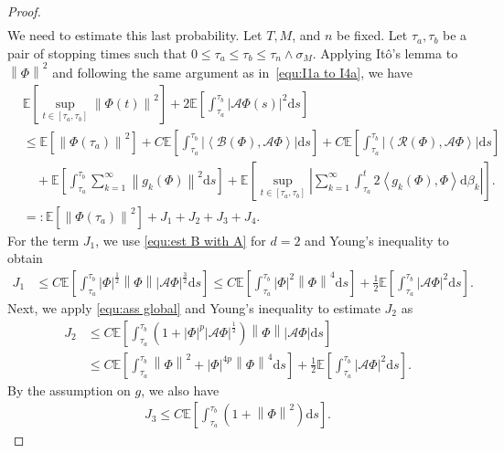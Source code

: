 \documentclass[11pt, reqno]{amsart}
\theoremstyle{definition}
\numberwithin{equation}{section}
\newcommand{\bb}{\mathbb}
\newcommand{\ds}{\mathrm{d}s}
\newcommand{\norm}[1]{\left\|{#1}\right\|}
\newcommand{\inpro}[2]{\left\langle#1,#2\right\rangle}
\newcommand{\abs}[1]{\left|{#1}\right|}
\begin{document}
\begin{proof}
\begin{align}
\end{align}
We need to estimate this last probability. Let $T,M$, and $n$ be fixed. Let $\tau_a,\tau_b$ be a pair of stopping times such that $0\leq \tau_a \leq \tau_b \leq \tau_n\wedge \sigma_M$. Applying It\^o's lemma to $\norm{\Phi}^2$ and following the same argument as in~\eqref{equ:I1a to I4a}, we have
\begin{align}\label{equ:sub tau J1 J4}
	&\bb{E} \left[ \sup_{t\in [\tau_a,\tau_b]} \norm{\Phi(t)}^2 \right] 
	+
	2 \bb{E} \left[ \int_{\tau_a}^{\tau_b} \abs{\mathcal{A} \Phi(s)}^2 \ds \right] 
	\nonumber\\
	&\leq
	\bb{E} \left[\norm{\Phi(\tau_a)}^2\right] 
	+
	C \bb{E}\left[\int_{\tau_a}^{\tau_b} \abs{\inpro{\mathcal{B}(\Phi)}{\mathcal{A}\Phi}}\ds \right]
	+
	C \bb{E} \left[\int_{\tau_a}^{\tau_b} \abs{\inpro{\mathcal{R}(\Phi)}{\mathcal{A}\Phi}}\ds \right]
	\nonumber\\
	&\quad
	+
	\bb{E} \left[\int_{\tau_a}^{\tau_b} \sum_{k=1}^\infty \norm{g_k(\Phi)}^2 \ds \right]
	+
	\bb{E} \left[\sup_{t\in [\tau_a, \tau_b]} \abs{\sum_{k=1}^\infty \int_{\tau_a}^t 2\inpro{g_k(\Phi)}{\Phi} \mathrm{d}\beta_k} \right].
	\nonumber\\
	&=: \bb{E} \left[\norm{\Phi(\tau_a)}^2\right] + J_1+J_2+J_3+J_4.
\end{align}
For the term $J_1$, we use \eqref{equ:est B with A} for $d=2$ and Young's inequality to obtain
\begin{align*}
	J_1
	&\leq
	C\bb{E} \left[\int_{\tau_a}^{\tau_b} \abs{\Phi}^{\frac12} \norm{\Phi} \abs{\mathcal{A} \Phi}^{\frac32} \ds \right] 
	\leq
	C \bb{E} \left[ \int_{\tau_a}^{\tau_b} \abs{\Phi}^2 \norm{\Phi}^4 \ds \right] 
	+
	\frac12 \bb{E} \left[\int_{\tau_a}^{\tau_b} \abs{\mathcal{A} \Phi}^2 \ds \right].
\end{align*}
Next, we apply \eqref{equ:ass global} and Young's inequality to estimate $J_2$ as
\begin{align*}
	J_2
	&\leq
	C\bb{E} \left[\int_{\tau_a}^{\tau_b} \left(1+\abs{\Phi}^p \abs{\mathcal{A} \Phi}^{\frac12}\right) \norm{\Phi} \abs{\mathcal{A} \Phi} \ds \right]
	\\
	&\leq
	C \bb{E} \left[ \int_{\tau_a}^{\tau_b} \norm{\Phi}^2+ \abs{\Phi}^{4p} \norm{\Phi}^4 \ds \right] 
	+
	\frac12 \bb{E} \left[\int_{\tau_a}^{\tau_b} \abs{\mathcal{A} \Phi}^2 \ds \right].
\end{align*}
By the assumption on $g$, we also have
\begin{align*}
	J_3 \leq
	C\bb{E}\left[\int_{\tau_a}^{\tau_b} \left(1+\norm{\Phi}^2\right) \ds\right].

\end{align*}
\end{proof}
\end{document}
